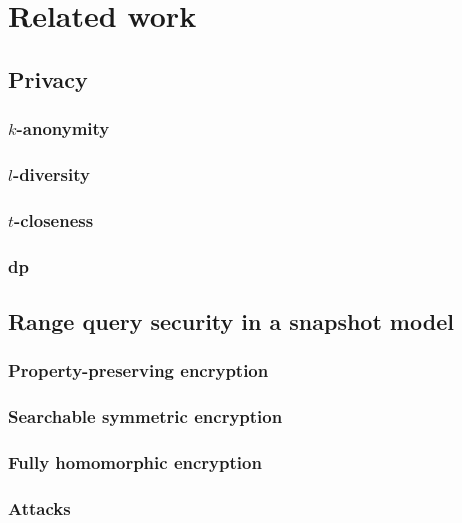 \chapter{Related work}
\thispagestyle{myheadings}

	\section{Privacy}

		\subsection{$k$-anonymity}

		\subsection{$l$-diversity}

		\subsection{$t$-closeness}

		\subsection{\acrlong{dp}}

	\section{Range query security in a snapshot model}

		\subsection{Property-preserving encryption}

		\subsection{Searchable symmetric encryption}

		\subsection{Fully homomorphic encryption}

		\subsection{Attacks}

